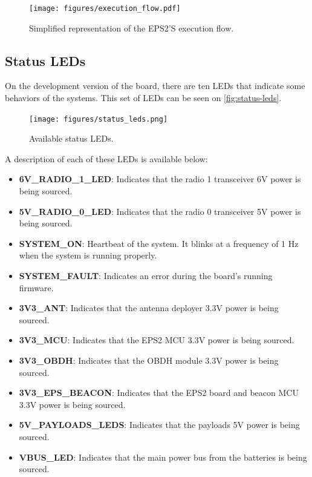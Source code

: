 \begin{figure}[!ht]
    \begin{center}
        \texttt{[image: figures/execution\_flow.pdf]}
        \caption{Simplified representation of the EPS2'S execution flow.}
        \label{fig:execution-flow}
    \end{center}
\end{figure}




\subsection{Status LEDs} \label{status-leds}

On the development version of the board, there are ten LEDs that indicate some behaviors of the systems. This set of LEDs can be seen on \autoref{fig:status-leds}.

\begin{figure}[!ht]
    \begin{center}
        \texttt{[image: figures/status\_leds.png]}
        \caption{Available status LEDs.}
        \label{fig:status-leds}
    \end{center}
\end{figure}

A description of each of these LEDs is available below:

\begin{itemize}
    \item \textbf{6V\_RADIO\_1\_LED}: Indicates that the radio 1 transceiver 6V power is being sourced.
    \item \textbf{5V\_RADIO\_0\_LED}: Indicates that the radio 0 transceiver 5V power is being sourced.
    \item \textbf{SYSTEM\_ON}: Heartbeat of the system. It blinks at a frequency of 1 Hz when the system is running properly.
    \item \textbf{SYSTEM\_FAULT}: Indicates an error during the board's running firmware.
    \item \textbf{3V3\_ANT}: Indicates that the antenna deployer 3.3V power is being sourced.
    \item \textbf{3V3\_MCU}: Indicates that the EPS2 MCU 3.3V power is being sourced.
    \item \textbf{3V3\_OBDH}: Indicates that the OBDH module 3.3V power is being sourced.
    \item \textbf{3V3\_EPS\_BEACON}: Indicates that the EPS2 board and beacon MCU 3.3V power is being sourced.
    \item \textbf{5V\_PAYLOADS\_LEDS}: Indicates that the payloads 5V power is being sourced.
    \item \textbf{VBUS\_LED}: Indicates that the main power bus from the batteries is being sourced.
\end{itemize}

